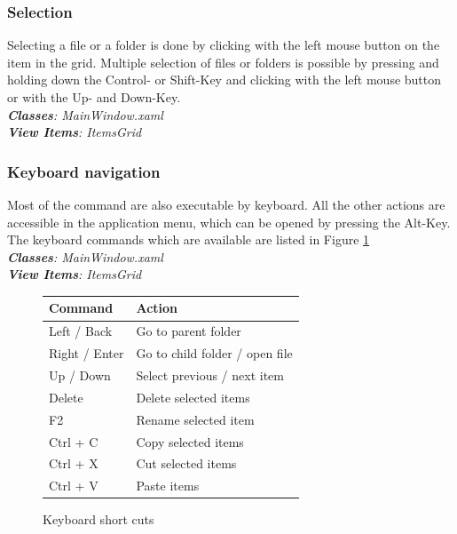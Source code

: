 \documentclass[JCDReport.tex]{subfiles}
\begin{document}
\subsubsection{Selection}
Selecting a file or a folder is done by clicking with the left mouse button on the item in the grid.
Multiple selection of files or folders is possible by pressing and holding down the Control- or Shift-Key and clicking with the left mouse button or with the Up- and Down-Key.\\
\textit{\textbf{Classes}: MainWindow.xaml\\
\textbf{View Items}: ItemsGrid}

\subsubsection{Keyboard navigation}
Most of the command are also executable by keyboard. All the other actions are accessible in the application menu, which can be opened by pressing the Alt-Key.\\
The keyboard commands which are available are listed in Figure \ref{table:keyboardShortCuts} \\
\textit{\textbf{Classes}: MainWindow.xaml\\
\textbf{View Items}: ItemsGrid}

\begin{figure}[h!]
	\centering
	\begin{tabular}{| l | l |}
		\hline
		\textbf{Command} & \textbf{Action} \\ \hline \hline
		Left / Back & Go to parent folder \\ \hline
		Right / Enter & Go to child folder / open file \\ \hline
		Up / Down & Select previous / next item \\ \hline
		Delete & Delete selected items \\ \hline
		F2 & Rename selected item \\ \hline
		Ctrl + C & Copy selected items \\ \hline
		Ctrl + X & Cut selected items \\ \hline
		Ctrl + V & Paste items \\ \hline	
	\end{tabular}
	\caption{Keyboard short cuts}
	\label{table:keyboardShortCuts}
\end{figure}

\end{document}
